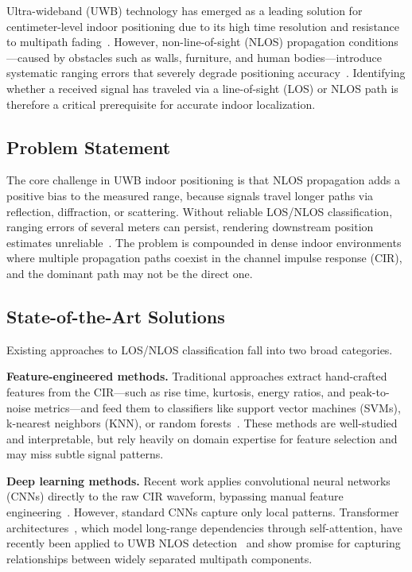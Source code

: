 \documentclass[conference]{IEEEtran}
\begin{document}
Ultra-wideband (UWB) technology has emerged as a leading solution for centimeter-level indoor positioning due to its high time resolution and resistance to multipath fading~\cite{b1}. However, non-line-of-sight (NLOS) propagation conditions---caused by obstacles such as walls, furniture, and human bodies---introduce systematic ranging errors that severely degrade positioning accuracy~\cite{b2}. Identifying whether a received signal has traveled via a line-of-sight (LOS) or NLOS path is therefore a critical prerequisite for accurate indoor localization.

\subsection{Problem Statement}

The core challenge in UWB indoor positioning is that NLOS propagation adds a positive bias to the measured range, because signals travel longer paths via reflection, diffraction, or scattering. Without reliable LOS/NLOS classification, ranging errors of several meters can persist, rendering downstream position estimates unreliable~\cite{b3}. The problem is compounded in dense indoor environments where multiple propagation paths coexist in the channel impulse response (CIR), and the dominant path may not be the direct one.

\subsection{State-of-the-Art Solutions}

Existing approaches to LOS/NLOS classification fall into two broad categories.

\textbf{Feature-engineered methods.} Traditional approaches extract hand-crafted features from the CIR---such as rise time, kurtosis, energy ratios, and peak-to-noise metrics---and feed them to classifiers like support vector machines (SVMs), k-nearest neighbors (KNN), or random forests~\cite{b3,b4}. These methods are well-studied and interpretable, but rely heavily on domain expertise for feature selection and may miss subtle signal patterns.

\textbf{Deep learning methods.} Recent work applies convolutional neural networks (CNNs) directly to the raw CIR waveform, bypassing manual feature engineering~\cite{b5}. However, standard CNNs capture only local patterns. Transformer architectures~\cite{b6}, which model long-range dependencies through self-attention, have recently been applied to UWB NLOS detection~\cite{b10,b11} and show promise for capturing relationships between widely separated multipath components.
\end{document}
